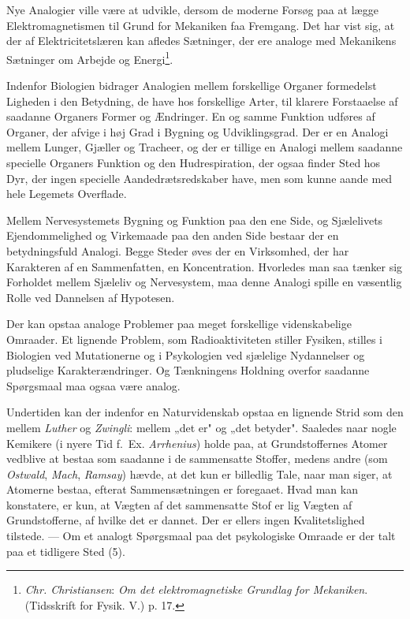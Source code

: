 \documentclass[12pt,a4paper]{book}
\newcommand{\apage}[1]{\marginnote{\footnotesize\textit{[#1]}}}
\begin{document}
Nye Analogier ville være at udvikle, dersom de moderne Forsøg paa at
lægge Elektromagnetismen til Grund for Mekaniken faa Fremgang. Det har
vist sig, at der af Elektricitetslæren kan afledes Sætninger, der ere
analoge med Mekanikens Sætninger om Arbejde og Energi\footnote{\emph{Chr.
Christiansen}: \emph{Om det elektromagnetiske Grundlag for Mekaniken}.
(Tidsskrift for Fysik. V.) p. 17.}.

\apage{185} Indenfor Biologien bidrager Analogien mellem forskellige Organer
formedelst Ligheden i den Betydning, de have hos forskellige Arter, til
klarere Forstaaelse af saadanne Organers Former og Ændringer. En og
samme Funktion udføres af Organer, der afvige i høj Grad i Bygning og
Udviklingsgrad. Der er en Analogi mellem Lunger, Gjæller og Tracheer, og
der er tillige en Analogi mellem saadanne specielle Organers Funktion og
den Hudrespiration, der ogsaa finder Sted hos Dyr, der ingen specielle
Aandedrætsredskaber have, men som kunne aande med hele Legemets
Overflade.

Mellem Nervesystemets Bygning og Funktion paa den ene Side, og
Sjælelivets Ejendommelighed og Virkemaade paa den anden Side bestaar der
en betydningsfuld Analogi. Begge Steder øves der en Virksomhed, der har
Karakteren af en Sammenfatten, en Koncentration. Hvorledes man saa
tænker sig Forholdet mellem Sjæleliv og Nervesystem, maa denne Analogi
spille en væsentlig Rolle ved Dannelsen af Hypotesen.

Der kan opstaa analoge Problemer paa meget forskellige videnskabelige
Omraader. Et lignende Problem, som Radioaktiviteten stiller Fysiken,
stilles i Biologien ved Mutationerne og i Psykologien ved sjælelige
Nydannelser og pludselige Karakterændringer. Og Tænkningens Holdning
overfor saadanne Spørgsmaal maa ogsaa være analog.

Undertiden kan der indenfor en Naturvidenskab opstaa en lignende Strid
som den mellem \emph{Luther} og \emph{Zwingli}: mellem „det er" og „det
betyder". Saaledes naar nogle Kemikere (i nyere Tid f.\ Ex.
\emph{Arrhenius}) holde paa, at Grundstoffernes Atomer vedblive at
bestaa som saadanne i de sammensatte Stoffer, medens andre (som
\emph{Ostwald}, \emph{Mach}, \emph{Ramsay}) hævde, at det kun er
billedlig Tale, naar man siger, at Atomerne bestaa, efterat
Sammensætningen er foregaaet. Hvad man kan konstatere, er kun, at Vægten
af det sammensatte Stof er lig Vægten af Grundstofferne, af hvilke det
er dannet. Der er ellers ingen Kvalitetslighed tilstede. --- Om et
analogt Spørgsmaal paa det psykologiske Omraade er der talt paa et
tidligere Sted (5).
\end{document}
